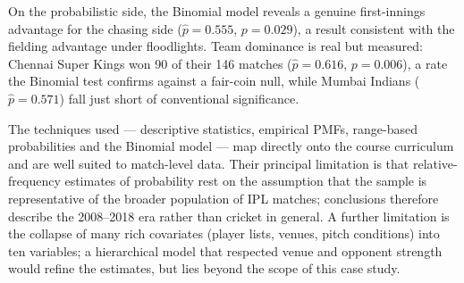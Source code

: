 \documentclass[11pt,a4paper]{article}
\begin{document}
On the probabilistic side, the Binomial model reveals a genuine first-innings
advantage for the chasing side ($\hat{p} = 0.555$,
$p = 0.029$), a result consistent with the fielding
advantage under floodlights. Team dominance is real but measured: Chennai Super
Kings won 90 of their 146 matches
($\hat{p} = 0.616$, $p = 0.006$), a rate the
Binomial test confirms against a fair-coin null, while Mumbai Indians
($\hat{p} = 0.571$) fall just short of conventional significance.

The techniques used --- descriptive statistics, empirical PMFs, range-based
probabilities and the Binomial model --- map directly onto the course curriculum
and are well suited to match-level data. Their principal limitation is that
relative-frequency estimates of probability rest on the assumption that the
sample is representative of the broader population of IPL matches; conclusions
therefore describe the 2008--2018 era rather than cricket in general. A further
limitation is the collapse of many rich covariates (player lists, venues, pitch
conditions) into ten variables; a hierarchical model that respected venue and
opponent strength would refine the estimates, but lies beyond the scope of this
case study.
\end{document}
